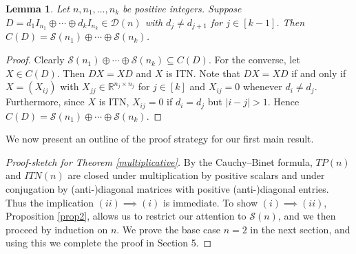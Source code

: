 \documentclass[11pt,reqno]{amsart}
\theoremstyle{plain}
\newtheorem{lemma}[theorem]{Lemma}
\theoremstyle{definition}
\numberwithin{equation}{section}
\def\cS{\mathcal S}
\def\cD{\mathcal D}
\begin{document}
\begin{lemma} \label{CDk-0}   Let $n, n_1,\ldots,n_k$ be positive integers. Suppose 
	$D = d_1 I_{n_1} \oplus \cdots \oplus d_k I_{n_k} \in \cD(n)$ with $d_j \ne d_{j+1}$ for 
	$j \in[k-1]$. Then
	$C(D) = \cS(n_1) \oplus \cdots \oplus \cS(n_k)$.
\end{lemma}

\begin{proof}
Clearly $\cS(n_1) \oplus \cdots \oplus \cS(n_k)\subseteq C(D)$. For the converse, let $X\in C(D)$. Then $DX = XD$ and $X$ is ITN. Note that $DX = XD$ if and only if 
$X = (X_{ij})$ with $X_{jj} \in \mathbb{R}^{n_j \times n_j}$ for $j \in [k]$ and
$X_{ij} = 0$ whenever $d_i \neq d_j$. Furthermore, since $X$ is ITN, $X_{ij} = 0$ if $d_i = d_j$ but $|i-j|> 1$. Hence $C(D) = \cS(n_1) \oplus \cdots \oplus \cS(n_k)$.
\end{proof}

We now present an outline of the proof strategy for our first main result.

\begin{proof}[Proof-sketch for Theorem \ref{multiplicative}]
By the Cauchy--Binet formula, $TP(n)$ and $ITN(n)$ are closed under multiplication by positive scalars and under conjugation by (anti-)diagonal matrices with positive (anti-)diagonal entries. Thus the implication $(ii) \implies (i)$ is immediate. To show  $(i) \implies (ii)$, Proposition \ref{prop2}, allows us to restrict our attention to $\cS(n)$, and we then proceed by induction on $n$.  We prove the base case $n=2$ in the next section, and using this we complete the proof in Section 5.
\end{proof}
\end{document}
